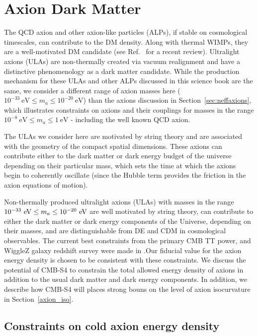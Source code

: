 \section{Axion Dark Matter}
The QCD axion and other axion-like particles (ALPs), if stable on cosmological timescales, can contribute to the DM density. Along with thermal WIMPs, they are a well-motivated DM candidate (see Ref.~\cite{Marsh:2015xka} for a recent review). Ultralight axions (ULAs) are non-thermally created via vacuum realignment and have a distinctive phenomenology as a dark matter candidate. While the production mechanism for these ULAs and other ALPs discussed in this science book are the same, we consider a different range of axion masses here ($10^{-33}~\mathrm{eV}\leq m_{a}\leq 10^{-20}~\mathrm{eV}$) than the axions discussion in Section~\ref{sec:neffaxions}, which illustrates constraints on axions and their couplings for masses in the range $10^{-8}~\mathrm{eV}\leq m_{a}\leq 1~\mathrm{eV}$ - including the well known QCD axion.

The ULAs we consider here are motivated by string theory and are associated with the geometry of the compact spatial dimensions. These axions can contribute either to the dark matter or dark energy budget of the universe depending on their particular mass, which sets the time at which the axions begin to coherently oscillate (since the Hubble term provides the friction in the axion equations of motion).

Non-thermally produced ultralight axions (ULAs) with masses in the range $10^{-33}~{\rm eV}\leq m_{a}\leq 10^{-20}~{\rm eV}$ are well motivated by string theory, can contribute to either the dark matter or dark energy components of the Universe, depending on their masses, and are distinguishable from DE and CDM in cosmological observables. The current best constraints from the primary CMB TT power, and WiggleZ galaxy redshift survey were made in \cite{Hlozek:2014lca}.Our fiducial value for the axion energy density is chosen to be consistent with these constraints. We discuss the potential of CMB-S4 to constrain the total allowed energy density of axions in addition to the usual dark matter and dark energy components. In addition, we describe how CMB-S4 will places strong bouns on the level of axion isocurvature in Section~\ref{axion_iso}.

\subsection{Constraints on cold axion energy density \label{sec:uladiabat}}

